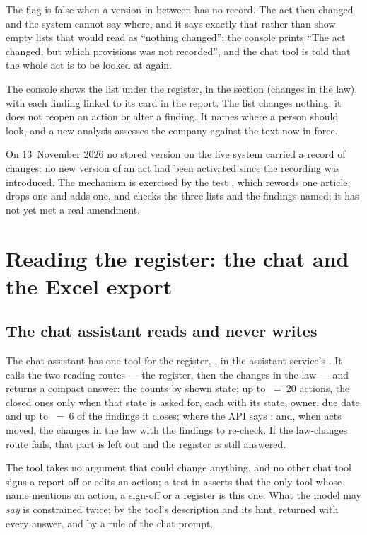 The flag  is false when a version in between has no record. The act then
changed and the system cannot say where, and it says exactly that rather than show empty lists
that would read as \enquote{nothing changed}: the console prints \enquote{The act changed, but
which provisions was not recorded}, and the chat tool is told that the whole act is to be
looked at again.

The console shows the list under the register, in the section 
(changes in the law), with each finding linked to its card in the report. The list changes
nothing: it does not reopen an action or alter a finding. It names where a person should look,
and a new analysis assesses the company against the text now in force.

On 13~November 2026 no stored version on the live system carried a record of changes: no new
version of an act had been activated since the recording was introduced. The mechanism is
exercised by the test ,
which rewords one article, drops one and adds one, and checks the three lists and the findings
named; it has not yet met a real amendment.


\section{Reading the register: the chat and the Excel export}\label{sec:register:reading}

\subsection{The chat assistant reads and never writes}

The chat assistant has one tool for the register, , in the assistant
service's . It calls the two reading routes --- the register, then
the changes in the law --- and returns a compact answer: the counts by shown state; up to
~=~20 actions, the closed ones only when that state is asked for, each with
its state, owner, due date and up to ~=~6 of the findings it closes;
 where the API says ; and, when acts moved, the changes
in the law with the findings to re-check. If the law-changes route fails, that part is left
out and the register is still answered.

The tool takes no argument that could change anything, and no other chat tool signs a report
off or edits an action; a test in  asserts that the only
tool whose name mentions an action, a sign-off or a register is this one. What the model may
\emph{say} is constrained twice: by the tool's description and its  hint, returned
with every answer, and by a rule of the chat prompt.

